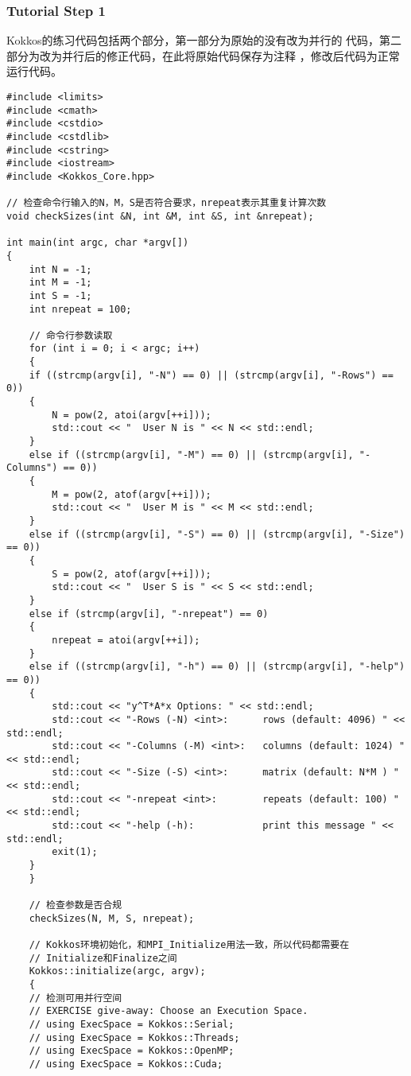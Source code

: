 \subsubsection{Tutorial Step 1}
Kokkos的练习代码包括两个部分，第一部分为原始的没有改为并行的
代码，第二部分为改为并行后的修正代码，在此将原始代码保存为注释
，修改后代码为正常运行代码。
\begin{lstlisting}
#include <limits>
#include <cmath>
#include <cstdio>
#include <cstdlib>
#include <cstring>
#include <iostream>
#include <Kokkos_Core.hpp>

// 检查命令行输入的N，M，S是否符合要求，nrepeat表示其重复计算次数
void checkSizes(int &N, int &M, int &S, int &nrepeat);

int main(int argc, char *argv[])
{
    int N = -1;
    int M = -1;
    int S = -1;
    int nrepeat = 100;

    // 命令行参数读取
    for (int i = 0; i < argc; i++)
    {
    if ((strcmp(argv[i], "-N") == 0) || (strcmp(argv[i], "-Rows") == 0))
    {
        N = pow(2, atoi(argv[++i]));
        std::cout << "  User N is " << N << std::endl;
    }
    else if ((strcmp(argv[i], "-M") == 0) || (strcmp(argv[i], "-Columns") == 0))
    {
        M = pow(2, atof(argv[++i]));
        std::cout << "  User M is " << M << std::endl;
    }
    else if ((strcmp(argv[i], "-S") == 0) || (strcmp(argv[i], "-Size") == 0))
    {
        S = pow(2, atof(argv[++i]));
        std::cout << "  User S is " << S << std::endl;
    }
    else if (strcmp(argv[i], "-nrepeat") == 0)
    {
        nrepeat = atoi(argv[++i]);
    }
    else if ((strcmp(argv[i], "-h") == 0) || (strcmp(argv[i], "-help") == 0))
    {
        std::cout << "y^T*A*x Options: " << std::endl;
        std::cout << "-Rows (-N) <int>:      rows (default: 4096) " << std::endl;
        std::cout << "-Columns (-M) <int>:   columns (default: 1024) " << std::endl;
        std::cout << "-Size (-S) <int>:      matrix (default: N*M ) " << std::endl;
        std::cout << "-nrepeat <int>:        repeats (default: 100) "<< std::endl;
        std::cout << "-help (-h):            print this message " << std::endl;
        exit(1);
    }
    }

    // 检查参数是否合规
    checkSizes(N, M, S, nrepeat);

    // Kokkos环境初始化，和MPI_Initialize用法一致，所以代码都需要在
    // Initialize和Finalize之间
    Kokkos::initialize(argc, argv);
    {
    // 检测可用并行空间
    // EXERCISE give-away: Choose an Execution Space.
    // using ExecSpace = Kokkos::Serial;
    // using ExecSpace = Kokkos::Threads;
    // using ExecSpace = Kokkos::OpenMP;
    // using ExecSpace = Kokkos::Cuda;


\end{lstlisting}
